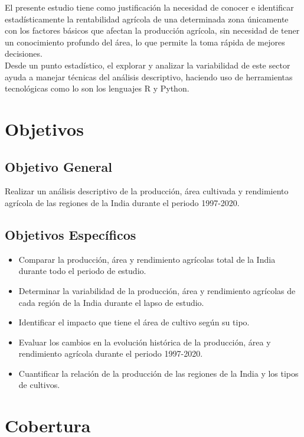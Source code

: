 \documentclass[oneside,11pt]{Latex/Classes/PhDthesisPSnPDF}
\begin{document}
El presente estudio tiene como justificación la necesidad de conocer e
identificar estadísticamente la rentabilidad agrícola de una determinada
zona únicamente con los factores básicos que afectan la producción
agrícola, sin necesidad de tener un conocimiento profundo del área, lo
que permite la toma rápida de mejores decisiones.\\

Desde un punto estadístico, el explorar y analizar la variabilidad de
este sector ayuda a manejar técnicas del análisis descriptivo, haciendo
uso de herramientas tecnológicas como lo son los lenguajes R y Python.

\section{Objetivos}

\subsection{Objetivo General}

Realizar un análisis descriptivo de la producción, área cultivada y
rendimiento agrícola de las regiones de la India durante el periodo
1997-2020.

\subsection{Objetivos Específicos}

\begin{itemize}
  \item{Comparar la producción, área y rendimiento agrícolas total de la India durante todo el periodo de estudio.}
  \item{Determinar la variabilidad de la producción, área y rendimiento agrícolas de cada región de la India durante el lapso de estudio.}
  \item{Identificar el impacto que tiene el área de cultivo según su tipo.}
  \item{Evaluar los cambios en la evolución histórica de la producción, área y rendimiento agrícola durante el periodo 1997-2020.}
  \item{Cuantificar la relación de la producción de las regiones de la India y los tipos de cultivos.}
\end{itemize}

\section{Cobertura}
\end{document}

